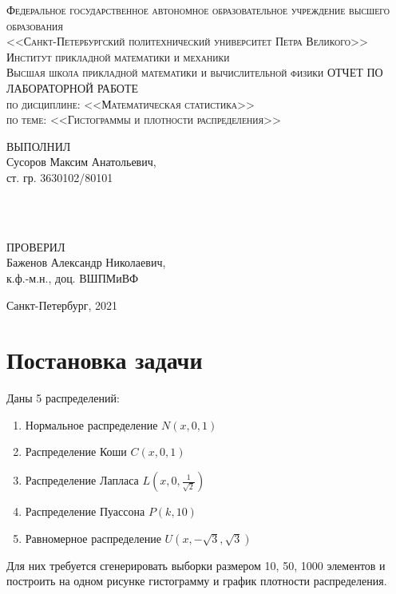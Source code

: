 \documentclass[a4paper, 14pt]{extreport}
\begin{document}
\begin{titlepage}
	\begin{center}
		\textsc{Федеральное государственное автономное образовательное учреждение высшего образования\\[2mm] 
			<<Санкт-Петербургский политехнический университет Петра Великого>>\\[18mm]
			Институт прикладной математики и механики\\[10mm]
			Высшая школа прикладной математики и вычислительной физики}
		\vfill
		\textsc{ОТЧЕТ ПО ЛАБОРАТОРНОЙ РАБОТЕ\\[2mm]
            по дисциплине: <<Математическая статистика>>\\[2mm]
			по теме: <<Гистограммы и плотности распределения>>}
	\end{center}
	\vfill
	
	\begin{minipage}{0.6\textwidth}
    ВЫПОЛНИЛ\\
    Сусоров Максим Анатольевич, \\
    ст. гр. 3630102/80101
	\end{minipage}
	\\\\
	
	\begin{minipage}{0.6\textwidth}
    ПРОВЕРИЛ\\
    Баженов Александр Николаевич, \\
    к.ф.-м.н., доц. ВШПМиВФ
	\end{minipage}
	
	\vfill
	\begin{center}	
		Санкт-Петербург, 2021
	\end{center}
\end{titlepage}	

\newpage
\tableofcontents

\chapter{Постановка задачи}

Даны 5 распределений:
\begin{enumerate}
	\item Нормальное распределение $N(x, 0, 1)$
	\item Распределение Коши $C(x, 0, 1)$
	\item Распределение Лапласа $L(x, 0, \frac{1}{\sqrt{2}})$
	\item Распределение Пуассона $P(k, 10)$
	\item Равномерное распределение $U(x, -\sqrt{3}, \sqrt{3})$	
\end{enumerate}
Для них требуется сгенерировать выборки размером 10, 50, 1000 элементов и построить на одном рисунке гистограмму и график плотности распределения.
\end{document}
